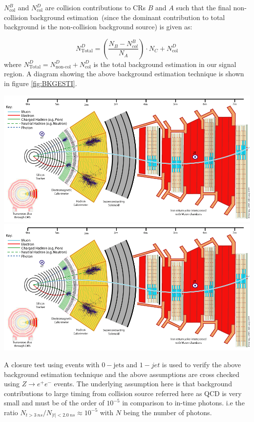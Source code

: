 $N^{B}_{\mbox{col}}$ and $N^{D}_{\mbox{col}}$ are collision contributions to  CRs $B$ and $A$ such that the final non-collision background estimation~(since the dominant contribution to total background  is the non-collision background source) is given as:

\begin{equation}
N^{D}_{\mbox{Total}} = \left(\frac{N_{B} - N^{B}_{col} }{N_{A}} \right)\cdot N_{C} + N^{D}_{\mbox{col}} 
\end{equation}\label{eq:bkg}
where $N^{D}_{\mbox{Total}} = N^{D}_{\mbox{non-col}} + N^{D}_{\mbox{col}}$ is the total background estimation in  our signal region.
A diagram showing the above background estimation technique is shown in figure \ref{fig:BKGESTI}.
\begin{center}
\centering
\includegraphics[scale=0.2]{THESISPLOTS/CMS_Slice.png}
\includegraphics[scale=0.2]{THESISPLOTS/CMS_Slice.png}
\label{fig:BKGESTI}
\end{center}

A closure test using events with $0-\mbox{jets}$ and $1-jet$ is used to verify the above  background estimation technique and the above assumptions are cross checked using $Z\rightarrow e^{+} e^{-}$ events. 
The underlying assumption here is that background contributions to large timing from collision source referred here as QCD is very small and must be of the order of $10^{-5}$ in comparison to in-time photons. i.e the ratio 
$ N_{t > 3~ns}/ N_{|t| < 2.0~ns} \approx 10^{-5}$ with $N$ being the number of photons.

